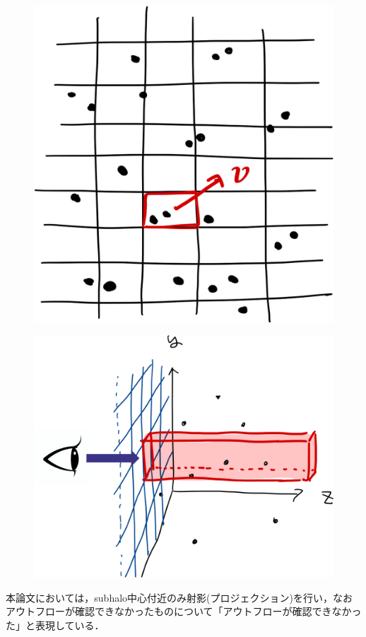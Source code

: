 \begin{figure}
	\centering
	
	\begin{minipage}[b]{0.33\linewidth}
		\centering
		\includegraphics[width=\linewidth]{./pic/outflow_ex4.png}
		\subcaption{}
		\label{}
	\end{minipage}
	\begin{minipage}[b]{0.45\linewidth}
		\centering
		\includegraphics[width=\linewidth]{./pic/outflow_ex5.png}
		\subcaption{}
		\label{}
	\end{minipage}
	
	\caption{}
	\label{fig:calc_outflow}
\end{figure}

本論文においては，subhalo中心付近のみ射影(プロジェクション)を行い，なおアウトフローが確認できなかったものについて「アウトフローが確認できなかった」と表現している．